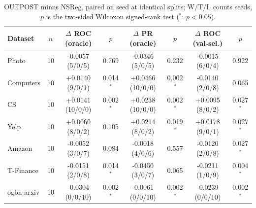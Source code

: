 \begin{table}[t]
\centering
\small
\begin{tabular}{lccccccc}
\toprule
Dataset & $n$ & $\Delta$ ROC (oracle) & $p$ & $\Delta$ PR (oracle) & $p$ & $\Delta$ ROC (val-sel.) & $p$ \\
\midrule
Photo & 10 & -0.0057 (5/0/5) & 0.769 & -0.0346 (5/0/5) & 0.232 & -0.0015 (6/0/4) & 0.922 \\
Computers & 10 & +0.0140 (9/0/1) & 0.014$^{*}$ & +0.0466 (10/0/0) & 0.002$^{*}$ & -0.0140 (2/0/8) & 0.065 \\
CS & 10 & +0.0141 (10/0/0) & 0.002$^{*}$ & +0.0238 (10/0/0) & 0.002$^{*}$ & +0.0095 (8/0/2) & 0.027$^{*}$ \\
Yelp & 10 & +0.0060 (8/0/2) & 0.105 & +0.0214 (8/0/2) & 0.019$^{*}$ & +0.0178 (9/0/1) & 0.027$^{*}$ \\
Amazon & 10 & -0.0052 (3/0/7) & 0.084 & -0.0018 (4/0/6) & 0.557 & -0.0120 (2/0/8) & 0.027$^{*}$ \\
T-Finance & 10 & -0.0151 (2/0/8) & 0.014$^{*}$ & -0.0450 (3/0/7) & 0.065 & -0.0211 (1/0/9) & 0.004$^{*}$ \\
ogbn-arxiv & 10 & -0.0304 (0/0/10) & 0.002$^{*}$ & -0.0061 (0/0/10) & 0.002$^{*}$ & -0.0239 (0/0/10) & 0.002$^{*}$ \\
\bottomrule
\end{tabular}
\caption{OUTPOST minus NSReg, paired on seed at identical splits; W/T/L counts seeds, $p$ is the two-sided Wilcoxon signed-rank test ($^{*}$: $p<0.05$).}
\label{tab:paired_nsreg}
\end{table}
